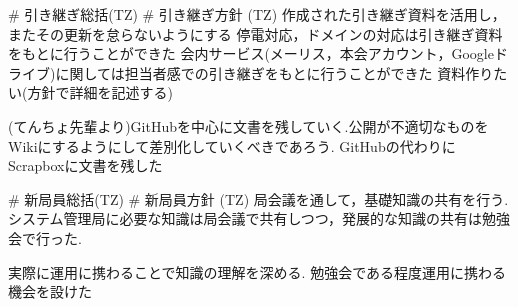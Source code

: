 \# 引き継ぎ総括(TZ)
\# 引き継ぎ方針 (TZ)
作成された引き継ぎ資料を活用し，またその更新を怠らないようにする
停電対応，ドメインの対応は引き継ぎ資料をもとに行うことができた
会内サービス(メーリス，本会アカウント，Googleドライブ)に関しては担当者感での引き継ぎをもとに行うことができた
資料作りたい(方針で詳細を記述する)

(てんちょ先輩より)GitHubを中心に文書を残していく.公開が不適切なものをWikiにするようにして差別化していくべきであろう.
GitHubの代わりにScrapboxに文書を残した

\# 新局員総括(TZ)
\# 新局員方針 (TZ)
局会議を通して，基礎知識の共有を行う.
システム管理局に必要な知識は局会議で共有しつつ，発展的な知識の共有は勉強会で行った.

実際に運用に携わることで知識の理解を深める.
勉強会である程度運用に携わる機会を設けた



